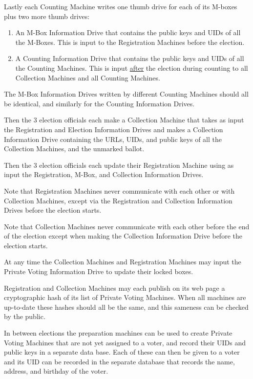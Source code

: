 \documentclass[12pt]{article}
\begin{document}
Lastly each Counting Machine
writes one thumb drive for each of its M-boxes plus two more thumb drives:
\begin{enumerate}
\item An M-Box Information Drive that contains the public keys and
UIDs of all the M-Boxes.  This is input to the Registration Machines
before the election.
\item A Counting Information Drive that contains the public keys and
UIDs of all the Counting Machines.
This is input \underline{after} the election during
counting to all Collection Machines and all Counting Machines.
\end{enumerate}
The M-Box Information Drives written by different Counting Machines
should all be identical, and similarly for the Counting Information
Drives.

Then the 3 election officials each make a Collection Machine
that takes as input the Registration and Election Information Drives
and makes a Collection Information Drive containing
the URLs, UIDs, and public keys of all the Collection Machines,
and the unmarked ballot.

Then the 3 election officials each update their Registration Machine
using as input the Registration, M-Box, and Collection
Information Drives.

Note that Registration Machines never communicate with each other
or with Collection Machines, except via the Registration and
Collection Information Drives before the election starts.

Note that Collection Machines never communicate with each other
before the end of the election
except when making the Collection Information Drive before the
election starts.

At any time the Collection Machines and Registration Machines
may input the Private Voting Information Drive to
update their locked boxes.

Registration and Collection Machines may each publish on its web page
a cryptographic hash of its list of Private Voting Machines.
When all machines are up-to-date
these hashes should all be the same, and this sameness
can be checked by the public.

In between elections the preparation machines can
be used to create Private Voting Machines that are not yet
assigned to a voter, and record their UIDs and public keys
in a separate data base.  Each of these can then be given to a voter
and its UID can be recorded in the separate database that records
the name, address, and birthday of the voter.
\end{document}
